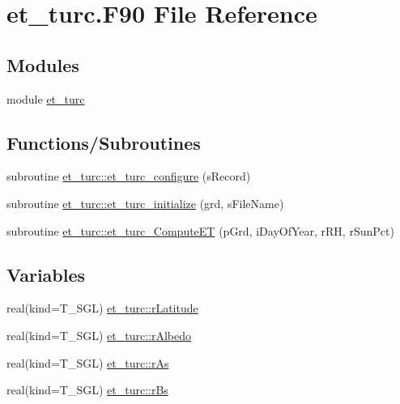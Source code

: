 \hypertarget{et__turc_8_f90}{
\section{et\_\-turc.F90 File Reference}
\label{et__turc_8_f90}
}
\subsection*{Modules}
\begin{DoxyCompactItemize}
\item 
module \hyperlink{namespaceet__turc}{et\_\-turc}
\end{DoxyCompactItemize}
\subsection*{Functions/Subroutines}
\begin{DoxyCompactItemize}
\item 
subroutine \hyperlink{namespaceet__turc_a0a286a90ef3f09bc6057a81bbf41f4f7}{et\_\-turc::et\_\-turc\_\-configure} (sRecord)
\item 
subroutine \hyperlink{namespaceet__turc_afea76b691cf4d70df273f6b725b00209}{et\_\-turc::et\_\-turc\_\-initialize} (grd, sFileName)
\item 
subroutine \hyperlink{namespaceet__turc_a75f81d99392f3f4dcfda8131a28826f1}{et\_\-turc::et\_\-turc\_\-ComputeET} (pGrd, iDayOfYear, rRH, rSunPct)
\end{DoxyCompactItemize}
\subsection*{Variables}
\begin{DoxyCompactItemize}
\item 
real(kind=T\_\-SGL) \hyperlink{namespaceet__turc_a0a0c03917fdebf44a4ab0750bbfac535}{et\_\-turc::rLatitude}
\item 
real(kind=T\_\-SGL) \hyperlink{namespaceet__turc_a7723f63f9716ea23b48bd05643e8b8f6}{et\_\-turc::rAlbedo}
\item 
real(kind=T\_\-SGL) \hyperlink{namespaceet__turc_a8ba55a89b265ba7548ea227841aeb5ed}{et\_\-turc::rAs}
\item 
real(kind=T\_\-SGL) \hyperlink{namespaceet__turc_a37fbef983b39e5edf49009f9be114973}{et\_\-turc::rBs}
\end{DoxyCompactItemize}
